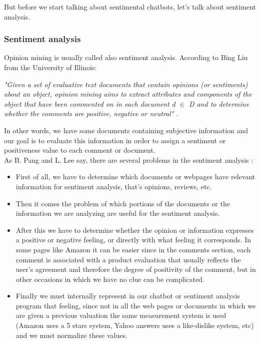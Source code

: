 \documentclass[12pt,twoside]{article}
\theoremstyle{plain}
\theoremstyle{definition}
\theoremstyle{remark}
\begin{document}
	But before we start talking about sentimental chatbots, let's talk about sentiment analysis.
	
		\subsubsection{Sentiment analysis}
		\label{sec::sentiment_analysis}
		
		Opinion mining is usually called also sentiment analysis. According to Bing Liu from the University of Illinois: \\
		
		\begin{center}
			\textit{"Given a set of evaluative text documents that contain opinions (or sentiments) about an object, opinion mining aims to extract attributes and components of the object that have been commented on in each document d $\in$ D and to determine whether the comments are positive, negative or neutral"} \cite{bingliu_sentiment_definition}.
		\end{center}
		
		In other words, we have some documents containing subjective information and our goal is to evaluate this information in order to assign a sentiment or positiveness value to each comment or document.\\
		
		As B. Pang and L. Lee say, there are several problems in the sentiment analysis \cite{sentiment_analysis_bpang_llee}:
		
		\begin{itemize}
			\item First of all, we have to determine which documents or webpages have relevant information for sentiment analysis, that's opinions, reviews, etc.
			\item Then it comes the problem of which portions of the documents or the information we are analyzing are useful for the sentiment analysis.
			\item After this we have to determine whether the opinion or information expresses a positive or negative feeling, or directly with what feeling it corresponds. In some pages like Amazon it can be easier since in the comments section, each comment is associated with a product evaluation that usually reflects the user's agreement and therefore the degree of positivity of the comment, but in other occasions in which we have no clue can be complicated.
			\item Finally we must internally represent in our chatbot or sentiment analysis program that feeling, since not in all the web pages or documents in which we are given a previous valuation the same measurement system is used (Amazon uses a 5 stars system, Yahoo answers uses a like-dislike system, etc) and we must normalize these values.
		\end{itemize}
	
\end{document}
